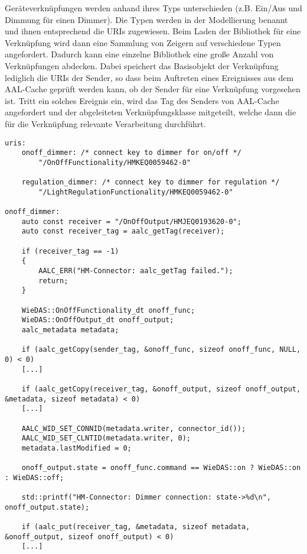 Geräteverknüpfungen werden anhand ihres Typs unterschieden (z.B. Ein/Aus und Dimmung für einen Dimmer).
Die Typen werden in der Modellierung benannt und ihnen entsprechend die URIs zugewiesen.
Beim Laden der Bibliothek für eine Verknüpfung wird dann eine Sammlung von Zeigern auf verschiedene
Typen angefordert.
Dadurch kann eine einzelne Bibliothek eine große Anzahl von Verknüpfungen abdecken.
Dabei speichert das Basisobjekt der Verknüpfung lediglich die URIs der Sender, so dass beim Auftreten
eines Ereignisses aus dem AAL-Cache geprüft werden kann, ob der Sender für eine Verknüpfung vorgesehen ist.
Tritt ein solches Ereignis ein, wird das Tag des Senders von AAL-Cache angefordert und der abgeleiteten
Verknüpfungsklasse mitgeteilt, welche dann die für die Verknüpfung relevante Verarbeitung durchführt.

\begin{lstlisting}[frame=single,caption={Ausschnitt aus der Modellierung einer Verknüpfung},label=conn_mod]
uris:
	onoff_dimmer: /* connect key to dimmer for on/off */
		"/OnOffFunctionality/HMKEQ0059462-0"

	regulation_dimmer: /* connect key to dimmer for regulation */
		"/LightRegulationFunctionality/HMKEQ0059462-0"

onoff_dimmer:
	auto const receiver = "/OnOffOutput/HMJEQ0193620-0";
	auto const receiver_tag = aalc_getTag(receiver);

	if (receiver_tag == -1)
	{
		AALC_ERR("HM-Connector: aalc_getTag failed.");
		return;
	}

	WieDAS::OnOffFunctionality_dt onoff_func;
	WieDAS::OnOffOutput_dt onoff_output;
	aalc_metadata metadata;

	if (aalc_getCopy(sender_tag, &onoff_func, sizeof onoff_func, NULL, 0) < 0)
	[...]

	if (aalc_getCopy(receiver_tag, &onoff_output, sizeof onoff_output, &metadata, sizeof metadata) < 0)
	[...]

	AALC_WID_SET_CONNID(metadata.writer, connector_id());
	AALC_WID_SET_CLNTID(metadata.writer, 0);
	metadata.lastModified = 0;

	onoff_output.state = onoff_func.command == WieDAS::on ? WieDAS::on : WieDAS::off;

	std::printf("HM-Connector: Dimmer connection: state->%d\n", onoff_output.state);

	if (aalc_put(receiver_tag, &metadata, sizeof metadata, &onoff_output, sizeof onoff_output) < 0)
	[...]
\end{lstlisting}

